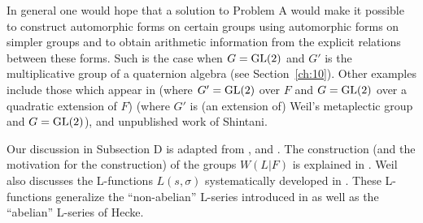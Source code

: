 In general one would hope that a solution to Problem A would make it possible to construct automorphic forms on certain groups using automorphic forms on simpler groups and to obtain arithmetic information from the explicit relations between these forms. Such is the case when $G = \operatorname{GL}(2)$ and $G'$ is the multiplicative group of a quaternion algebra (see Section~\ref{ch:10}). Other examples include those which appear in \cite{Jacquet} (where $G' = \operatorname{GL}(2)$ over $F$ and $G = \operatorname{GL}(2)$ over a quadratic extension of $F$) \cite{Gelbart3} (where $G'$ is (an extension of) Weil's metaplectic group and $G = \operatorname{GL}(2)$), and unpublished work of Shintani.

Our discussion in Subsection D is adapted from \cite{Shalika}, \cite{Langlands2} and \cite{JacquetLanglands}. The construction (and the motivation for the construction) of the groups $W(L|F)$ is explained in \cite{Weil5}. Weil also discusses the L-functions $L(s,\sigma)$ systematically developed in \cite{Langlands3}. These L-functions generalize the ``non-abelian'' L-series introduced in \cite{Artin} as well as the ``abelian'' L-series of Hecke.
